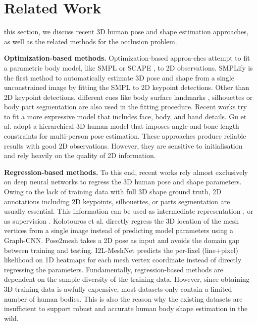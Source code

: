 \documentclass[journal]{IEEEtran}
\begin{document}
\section{Related Work}
 this section, we discuss recent 3D human pose and shape estimation approaches, as well as the related methods for the occlusion problem.

\noindent\textbf{Optimization-based methods.} Optimization-based approa-ches attempt to fit a parametric body model, like SMPL \cite{SMPL:2015} or SCAPE \cite{anguelov2005scape}, to 2D observations. SMPLify \cite{Bogo:ECCV:2016} is the first method to automatically estimate 3D pose and shape from a single unconstrained image by fitting the SMPL to 2D keypoint detections. Other than 2D keypoint detections, different cues like body surface landmarks \cite{lassner2017unite}, silhouettes \cite{lassner2017unite} or body part segmentation \cite{zanfir2018monocular} are also used in the fitting procedure. Recent works try to fit a more expressive model \cite{joo2018total,xiang2019monocular} that includes face, body, and hand details. Gu et al. \cite{gu2019multi} adopt a hierarchical 3D human model that imposes angle and bone length constraints for multi-person pose estimation. These approaches produce reliable results with good 2D observations. However, they are sensitive to initialisation and rely heavily on the quality of 2D information.

\noindent\textbf{Regression-based methods.} To this end, recent works rely almost exclusively on deep neural networks to regress the 3D human pose and shape parameters. Owing to the lack of training data with full 3D shape ground truth, 2D annotations including 2D keypoints, silhouettes, or parts segmentation are usually essential. This information can be used as intermediate representation \cite{kato2018neural,xu2019denserac}, or as supervision \cite{pavlakos2018learning,kato2018neural}. Kolotouros et al. \cite{kolotouros2019convolutional} directly regress the 3D location of the mesh vertices from a single image instead of predicting model parameters using a Graph-CNN. Pose2mesh \cite{Choi_2020_ECCV_Pose2Mesh} takes a 2D pose as input and avoids the domain gap between training and testing. I2L-MeshNet \cite{Moon_2020_ECCV_I2L-MeshNet} predicts the
per-lixel (line+pixel) likelihood on 1D heatmaps for each mesh vertex coordinate instead of directly regressing the parameters. Fundamentally, regression-based methods are dependent on the sample diversity of the training data. However, since obtaining 3D training data is awfully expensive, most datasets only contain  a limited number of human bodies. This is also the reason why the existing datasets are insufficient to support robust and accurate human body shape estimation in the wild.
\end{document}

